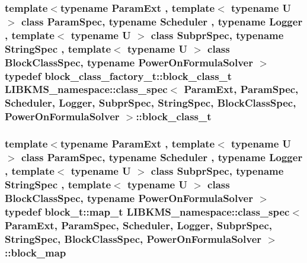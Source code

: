 \hypertarget{structLIBKMS__namespace_1_1class__spec_a286bbf51f31bec7830f08859385897d0}{
\subsubsection[{block\-\_\-class\-\_\-t}]{\setlength{\rightskip}{0pt plus 5cm}template$<$typename Param\-Ext , template$<$ typename U $>$ class Param\-Spec, typename Scheduler , typename Logger , template$<$ typename U $>$ class Subpr\-Spec, typename String\-Spec , template$<$ typename U $>$ class Block\-Class\-Spec, typename Power\-On\-Formula\-Solver $>$ typedef {\bf block\-\_\-class\-\_\-factory\-\_\-t\-::block\-\_\-class\-\_\-t} {\bf L\-I\-B\-K\-M\-S\-\_\-namespace\-::class\-\_\-spec}$<$ Param\-Ext, Param\-Spec, Scheduler, Logger, Subpr\-Spec, String\-Spec, Block\-Class\-Spec, Power\-On\-Formula\-Solver $>$\-::{\bf block\-\_\-class\-\_\-t}}}\label{structLIBKMS__namespace_1_1class__spec_a286bbf51f31bec7830f08859385897d0}
\hypertarget{structLIBKMS__namespace_1_1class__spec_a2f616ebd1545da2b36511f8d88ed113c}{
\subsubsection[{block\-\_\-map}]{\setlength{\rightskip}{0pt plus 5cm}template$<$typename Param\-Ext , template$<$ typename U $>$ class Param\-Spec, typename Scheduler , typename Logger , template$<$ typename U $>$ class Subpr\-Spec, typename String\-Spec , template$<$ typename U $>$ class Block\-Class\-Spec, typename Power\-On\-Formula\-Solver $>$ typedef {\bf block\-\_\-t\-::map\-\_\-t} {\bf L\-I\-B\-K\-M\-S\-\_\-namespace\-::class\-\_\-spec}$<$ Param\-Ext, Param\-Spec, Scheduler, Logger, Subpr\-Spec, String\-Spec, Block\-Class\-Spec, Power\-On\-Formula\-Solver $>$\-::{\bf block\-\_\-map}}}\label{structLIBKMS__namespace_1_1class__spec_a2f616ebd1545da2b36511f8d88ed113c}
